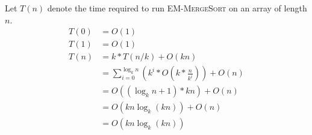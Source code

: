 Let $T(n)$ denote the time required to run \textsc{EM-MergeSort} on an array of length $n$.
\begin{equation}
\begin{split}
T(0) &= O(1)\\
T(1) &= O(1)\\
T(n) &= k * T(n/k) + O(k n)\\
&= \sum_{i = 0}^{\log_k{n}} (k^i * O(k * \frac{n}{k^i})) + O(n)\\
&= O((\log_k{n} + 1) *  k n)+ O(n)\\
&= O(k n \log_k{(k n)}) + O(n)\\
&= O(k n \log_k{(k n)})\\
\end{split}
\end{equation}